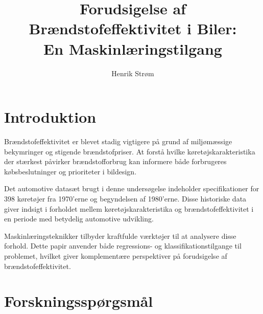 \documentclass[a4paper, twocolumn]{article}
\author{Henrik Strøm}
\title{Forudsigelse af Brændstofeffektivitet i Biler:\\En Maskinlæringstilgang}
\begin{document}

\section{Introduktion}
\label{sec:intro}

Brændstofeffektivitet er blevet stadig vigtigere på grund af miljømæssige bekymringer og stigende brændstofpriser. At forstå hvilke køretøjskarakteristika der stærkest påvirker brændstofforbrug kan informere både forbrugeres købsbeslutninger og prioriteter i bildesign.

Det automotive datasæt brugt i denne undersøgelse indeholder specifikationer for 398 køretøjer fra 1970'erne og begyndelsen af 1980'erne. Disse historiske data giver indsigt i forholdet mellem køretøjskarakteristika og brændstofeffektivitet i en periode med betydelig automotive udvikling.

Maskinlæringsteknikker tilbyder kraftfulde værktøjer til at analysere disse forhold. Dette papir anvender både regressions- og klassifikationstilgange til problemet, hvilket giver komplementære perspektiver på forudsigelse af brændstofeffektivitet.

\section{Forskningsspørgsmål}
\label{sec:research}
\end{document}

